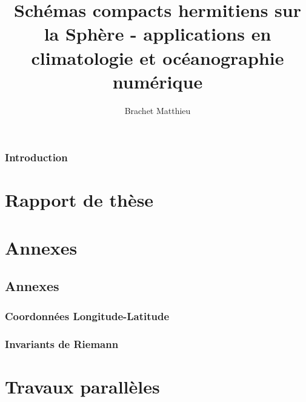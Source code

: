 \documentclass[10pt,a4paper]{book}
\author{Brachet Matthieu}
\title{Schémas compacts hermitiens sur la Sphère - applications en climatologie et océanographie numérique}
\begin{document}
\maketitle
\newpage
\tableofcontents
\listoffigures
\listoftables

\newpage

\section*{Introduction}
%

\part{Rapport de thèse}









\part{Annexes}

\chapter{Annexes}
\section{Coordonnées Longitude-Latitude}

\section{Invariants de Riemann}


\part{Travaux parallèles}

%



\end{document}
